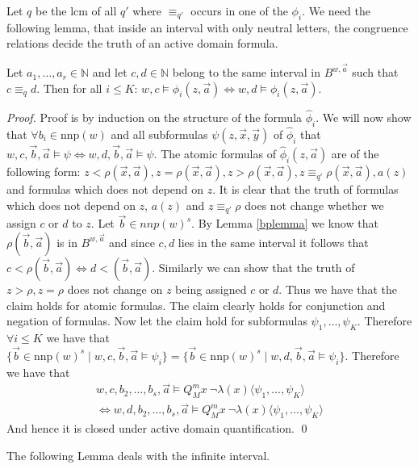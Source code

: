 \documentclass[envcountsame]{llncs}
\newcommand{\Nat}{\mathbb{N}}
\newcommand{\mon}[2]{Q_{#1}^{#2}}
\newcommand{\nnp}{\mathrm{nnp}}
\begin{document}
Let $q$ be the lcm of all $q'$ where $\equiv_{q'}$ occurs in one of the $\phi_i$. We need the following lemma, that inside an interval with only neutral letters, the congruence relations decide the truth of an active domain formula. 
\begin{lemma}
\label{lem_witInIntrv}
Let $a_1,\dots,a_r \in \Nat$ and let $c,d \in \Nat$ belong to the same interval in $B^{w, \vec a}$ such that $c \equiv_q d$. Then for all $i \leq K$:
$w,c \vDash \phi_i(z,\vec a) \Leftrightarrow w,d \vDash \phi_i(z, \vec a)$.
\end{lemma}
\begin{proof}
Proof is by induction on the structure of the formula $\hat \phi_i$. We will now show that $\forall b_i \in \nnp(w)$ and all
subformulas $\psi(z,\vec x,\vec y)$ of $\hat \phi_i$ that $w,c,\vec b, \vec a \vDash \psi \Leftrightarrow w,d,\vec b,\vec a \vDash
\psi$. The atomic formulas of $\hat \phi_i(z,\vec a)$ are of the following form: $z < \rho(\vec x,\vec a), z = \rho(\vec x,\vec a), z>
\rho(\vec x,\vec a) , z \equiv_{q'} \rho(\vec x,\vec a), a(z)$ and formulas which does not depend on $z$. It is clear that the truth of formulas which
does not depend on $z$, $a(z)$ and $z \equiv_{q'} \rho$ does not change whether we assign $c$ or $d$ to $z$. Let $\vec b \in nnp(w)^s$.
By Lemma \ref{bplemma} we know that $\rho(\vec b,\vec a)$ is in $B^{w,\vec a}$ and since $c,d$ lies in the same interval it follows that $c<
\rho(\vec b,\vec a) \Leftrightarrow d<(\vec b,\vec a)$. Similarly we can show that the truth of $z>\rho,z=\rho$ does not change on $z$
being assigned $c$ or $d$. Thus we have that the claim holds for atomic formulas.
The claim clearly holds for conjunction and negation of formulas. Now let the claim hold for subformulas $\psi_1,\dots,\psi_K$. Therefore $\forall i\leq K$ we have that
$\{\vec b \in \nnp(w)^s \mid w,c,\vec b,\vec a\vDash \psi_i\} = \{\vec b \in \nnp(w)^s \mid w,d,\vec b,\vec a \vDash \psi_i\}$.
Therefore we have that
\begin{eqnarray*}
w, c,b_2,\ldots,b_s,\vec a \vDash \mon{M}{m} x ~\neg \lambda(x) \langle \psi_1,\dots,\psi_K \rangle \\
\Leftrightarrow w, d,b_2,\ldots,b_s,\vec a \vDash \mon{M}{m} x ~\neg \lambda(x) \langle \psi_1,\dots,\psi_K \rangle
\end{eqnarray*}
And hence it is closed under active domain quantification.
\qed \end{proof}

The following Lemma deals with the infinite interval.
\end{document}
